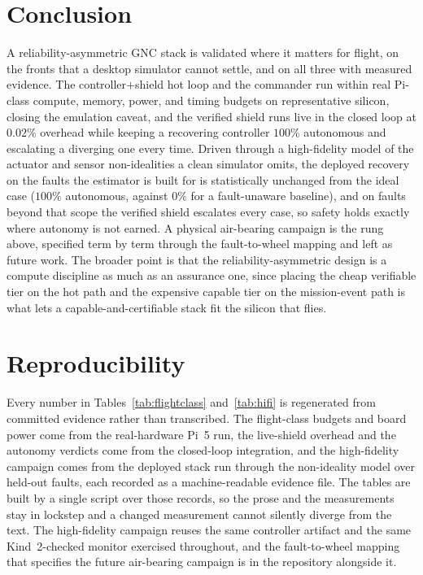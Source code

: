 \documentclass[11pt]{article}
\begin{document}
\section{Conclusion}
A reliability-asymmetric GNC stack is validated where it matters for flight, on the fronts that a
desktop simulator cannot settle, and on all three with measured evidence. The controller$+$shield
hot loop and the commander run within real Pi-class compute, memory, power, and timing budgets on
representative silicon, closing the emulation caveat, and the verified shield runs live in the
closed loop at $0.02\%$ overhead while keeping a recovering controller $100\%$ autonomous and
escalating a diverging one every time. Driven through a high-fidelity model of the actuator and
sensor non-idealities a clean simulator omits, the deployed recovery on the faults the estimator is
built for is statistically unchanged from the ideal case ($100\%$ autonomous, against $0\%$ for a
fault-unaware baseline), and on faults beyond that scope the verified shield escalates every case,
so safety holds exactly where autonomy is not earned. A physical air-bearing campaign is the rung
above, specified term by term through the fault-to-wheel mapping and left as future work. The
broader point is that the reliability-asymmetric design is a compute discipline as much as an
assurance one, since placing the cheap verifiable tier on the hot path and the expensive capable
tier on the mission-event path is what lets a capable-and-certifiable stack fit the silicon that
flies.

\section{Reproducibility}
Every number in Tables~\ref{tab:flightclass} and~\ref{tab:hifi} is regenerated from committed
evidence rather than transcribed. The flight-class budgets and board power come from the
real-hardware Pi~5 run, the live-shield overhead and the autonomy verdicts come from the
closed-loop integration, and the high-fidelity campaign comes from the deployed stack run through
the non-ideality model over held-out faults, each recorded as a machine-readable evidence file. The
tables are built by a single script over those records, so the prose and the measurements stay in
lockstep and a changed measurement cannot silently diverge from the text. The high-fidelity
campaign reuses the same controller artifact and the same Kind~2-checked monitor exercised
throughout, and the fault-to-wheel mapping that specifies the future air-bearing campaign is in the
repository alongside it.
\end{document}
